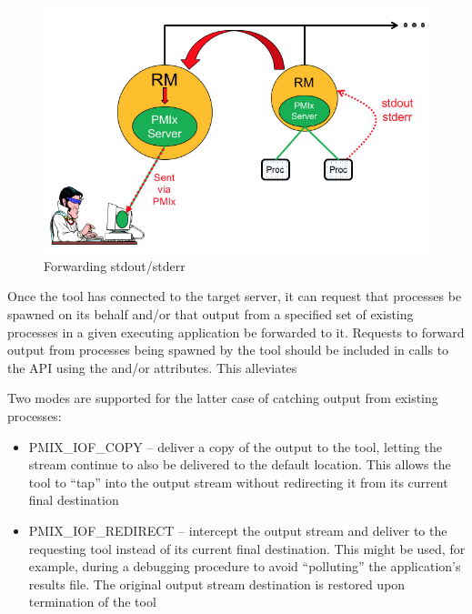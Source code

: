 \begin{figure}
  \begin{center}
    \includegraphics[clip,width=0.98\linewidth]{figs/output.png}
  \end{center}
    \caption{Forwarding stdout/stderr}
    \label{fig:stdouterr}
\end{figure}

Once the tool has connected to the target server, it can request that processes be spawned on its behalf and/or that output from a specified set of existing processes in a given executing application be forwarded to it. Requests to forward output from processes being spawned by the tool should be included in calls to the  \ac{API} using the  and/or  attributes. This alleviates

Two modes are supported for the latter case of catching output from existing processes:

\begin{itemize}
    \item PMIX_IOF_COPY – deliver a copy of the output to the tool, letting the stream continue to also be delivered to the default location. This allows the tool to “tap” into the output stream without redirecting it from its current final destination
    \item PMIX_IOF_REDIRECT – intercept the output stream and deliver to the requesting tool instead of its current final destination. This might be used, for example, during a debugging procedure to avoid “polluting” the application’s results file. The original output stream destination is restored upon termination of the tool
\end{itemize}

